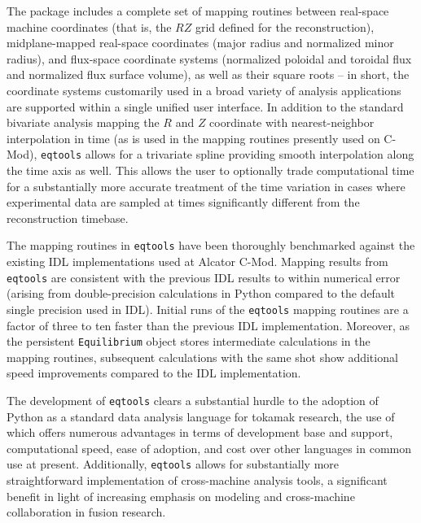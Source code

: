 \documentclass[12pt,floatfix,showpacs]{revtex4-1}
\newcommand{\eqtools}{\texttt{eqtools}\xspace}
\begin{document}
The package includes a complete set of mapping routines between real-space machine coordinates (that is, the $RZ$ grid defined for the reconstruction), midplane-mapped real-space coordinates (major radius and normalized minor radius), and flux-space coordinate systems (normalized poloidal and toroidal flux and normalized flux surface volume), as well as their square roots -- in short, the coordinate systems customarily used in a broad variety of analysis applications are supported within a single unified user interface.  
In addition to the standard bivariate analysis mapping the $R$ and $Z$ coordinate with nearest-neighbor interpolation in time (as is used in the mapping routines presently used on C-Mod), \eqtools allows for a trivariate spline providing smooth interpolation along the time axis as well.  
This allows the user to optionally trade computational time for a substantially more accurate treatment of the time variation in cases where experimental data are sampled at times significantly different from the reconstruction timebase.

The mapping routines in \eqtools have been thoroughly benchmarked against the existing IDL implementations used at Alcator C-Mod.  
Mapping results from \eqtools are consistent with the previous IDL results to within numerical error (arising from double-precision calculations in Python compared to the default single precision used in IDL).
Initial runs of the \eqtools mapping routines are a factor of three to ten faster than the previous IDL implementation.
Moreover, as the persistent \verb|Equilibrium| object stores intermediate calculations in the mapping routines, subsequent calculations with the same shot show additional speed improvements compared to the IDL implementation.

The development of \eqtools clears a substantial hurdle to the adoption of Python as a standard data analysis language for tokamak research, the use of which offers numerous advantages in terms of development base and support, computational speed, ease of adoption, and cost over other languages in common use at present.
Additionally, \eqtools allows for substantially more straightforward implementation of cross-machine analysis tools, a significant benefit in light of increasing emphasis on modeling and cross-machine collaboration in fusion research.

\end{document}
